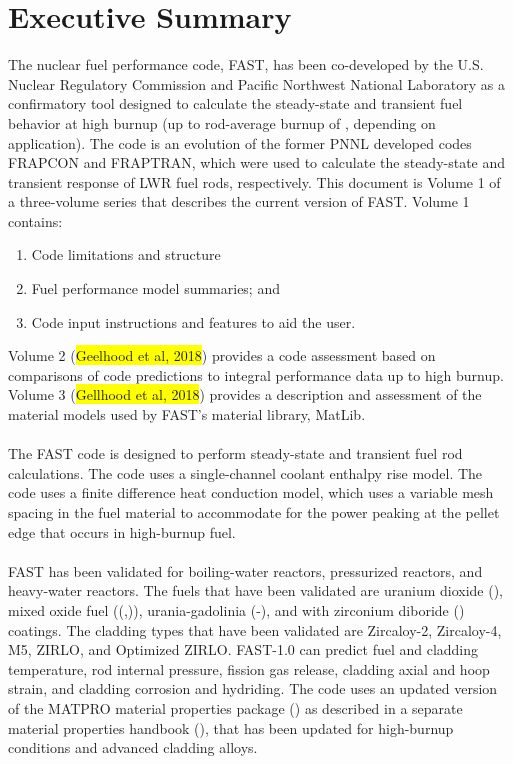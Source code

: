 \chapter*{Executive Summary}
The nuclear fuel performance code, FAST, has been co-developed by the U.S.  Nuclear Regulatory
Commission and Pacific Northwest National Laboratory as a confirmatory tool designed to calculate
the steady-state and transient fuel behavior at high burnup (up to rod-average burnup of
, depending on application). The code is an evolution of the former PNNL
developed codes FRAPCON and FRAPTRAN, which were used to calculate the steady-state and transient
response of LWR fuel rods, respectively. This document is Volume 1 of a three-volume series that
describes the current version of FAST. Volume 1 contains: 
\begin{enumerate}
    \item Code limitations and structure 
    \item Fuel performance model summaries; and 
    \item Code input instructions and features to aid the user. 
\end{enumerate}

Volume 2 (\colorbox{yellow}{Geelhood et al, 2018}) provides a code assessment based on comparisons
of code predictions to integral performance data up to high burnup. Volume 3
(\colorbox{yellow}{Gellhood et al, 2018}) provides a description and assessment of the material
models used by FAST's material library, MatLib.
\\
\\
The FAST code is designed to perform steady-state and transient fuel rod calculations. The code uses
a single-channel coolant enthalpy rise model.  The code uses a finite difference heat conduction
model, which uses a variable mesh spacing in the fuel material to accommodate for the power peaking
at the pellet edge that occurs in high-burnup fuel.
\\
\\
FAST has been validated for boiling-water reactors, pressurized reactors, and heavy-water reactors.
The fuels that have been validated are uranium dioxide (), mixed oxide
fuel ((,)), urania-gadolinia
(\UO-), and \UO with zirconium diboride () coatings.
The cladding types that have been validated are Zircaloy-2, Zircaloy-4, M5, ZIRLO, and Optimized
ZIRLO.  FAST-1.0 can predict fuel and cladding temperature, rod internal pressure, fission gas
release, cladding axial and hoop strain, and cladding corrosion and hydriding. The code uses an
updated version of the MATPRO material properties package (\cite{ref:Hagrman1981a})
as described in a separate material properties handbook (\cite{ref:Luscher2014b}),
that has been updated for high-burnup conditions and advanced cladding alloys.
\newpage\null
{}
